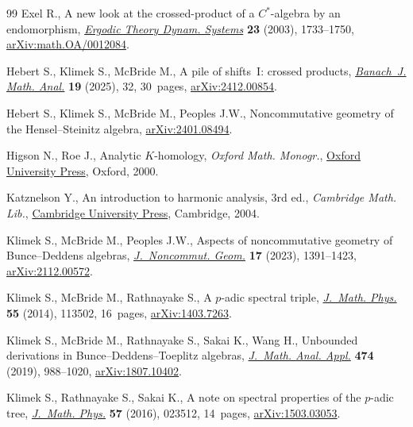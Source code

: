 \begin{thebibliography}{99}
Exel R., A new look at the crossed-product of a {$C^*$}-algebra by an
 endomorphism,
 \href{https://doi.org/10.1017/S0143385702001797}{\textit{Ergodic Theory
 Dynam. Systems}} \textbf{23} (2003), 1733--1750,
 \href{http://arxiv.org/abs/math.OA/0012084}{arXiv:math.OA/0012084}.

Hebert S., Klimek S., McBride M., A pile of shifts~{I}: crossed products,
 \href{https://doi.org/10.1007/s43037-025-00425-6}{\textit{Banach~J. Math.
 Anal.}} \textbf{19} (2025), 32, 30~pages,
 \href{http://arxiv.org/abs/2412.00854}{arXiv:2412.00854}.

Hebert S., Klimek S., McBride M., Peoples J.W., Noncommutative geometry of the
 {H}ensel--{S}teinitz algebra,
 \href{http://arxiv.org/abs/2401.08494}{arXiv:2401.08494}.

Higson N., Roe J., Analytic {$K$}-homology, \textit{Oxford Math. Monogr.},
 \href{https://doi.org/10.1093/oso/9780198511762.001.0001}{Oxford University
 Press}, Oxford, 2000.

Katznelson Y., An introduction to harmonic analysis, 3rd ed., \textit{Cambridge Math. Lib.}, \href{https://doi.org/10.1017/CBO9781139165372}{Cambridge University
 Press}, Cambridge, 2004.

Klimek S., McBride M., Peoples J.W., Aspects of noncommutative geometry of
 {B}unce--{D}eddens algebras,
 \href{https://doi.org/10.4171/jncg/521}{\textit{J.~Noncommut. Geom.}}
 \textbf{17} (2023), 1391--1423,
 \href{http://arxiv.org/abs/2112.00572}{arXiv:2112.00572}.

Klimek S., McBride M., Rathnayake S., A {$p$}-adic spectral triple,
 \href{https://doi.org/10.1063/1.4900923}{\textit{J.~Math. Phys.}} \textbf{55}
 (2014), 113502, 16~pages,
 \href{http://arxiv.org/abs/1403.7263}{arXiv:1403.7263}.

Klimek S., McBride M., Rathnayake S., Sakai K., Wang H., Unbounded derivations
 in {B}unce--{D}eddens--{T}oeplitz algebras,
 \href{https://doi.org/10.1016/j.jmaa.2019.02.001}{\textit{J.~Math. Anal.
 Appl.}} \textbf{474} (2019), 988--1020,
 \href{http://arxiv.org/abs/1807.10402}{arXiv:1807.10402}.

Klimek S., Rathnayake S., Sakai K., A note on spectral properties of the
 {$p$}-adic tree, \href{https://doi.org/10.1063/1.4940339}{\textit{J.~Math.
 Phys.}} \textbf{57} (2016), 023512, 14~pages,
 \href{http://arxiv.org/abs/1503.03053}{arXiv:1503.03053}.


\end{thebibliography}
